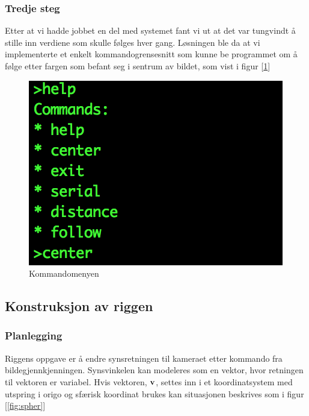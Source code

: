 \subsubsection{Tredje steg}

Etter at vi hadde jobbet en del med systemet fant vi ut at det var tungvindt å stille inn verdiene som skulle følges hver gang. Løsningen ble da at vi implementerte et enkelt kommandogrensesnitt som kunne be programmet om å følge etter fargen som befant seg i sentrum av bildet, som vist i figur [\ref{fig:commandmenu}]

\begin{figure}[h!]
	\centering
	\includegraphics[scale=0.8]{img/command-menu.png}
	\caption{Kommandomenyen}
	\label{fig:commandmenu}
\end{figure}

\subsection{Konstruksjon av riggen}

\subsubsection{Planlegging}
Riggens oppgave er å endre synsretningen til kameraet etter kommando fra bildegjennkjenningen. Synsvinkelen kan modeleres som en vektor, hvor retningen til vektoren er variabel. Hvis vektoren, $\bf{v}$, settes inn i et koordinatsystem med utspring i origo og sfærisk koordinat brukes kan situasjonen beskrives som i figur [\ref{fig:spher}]

